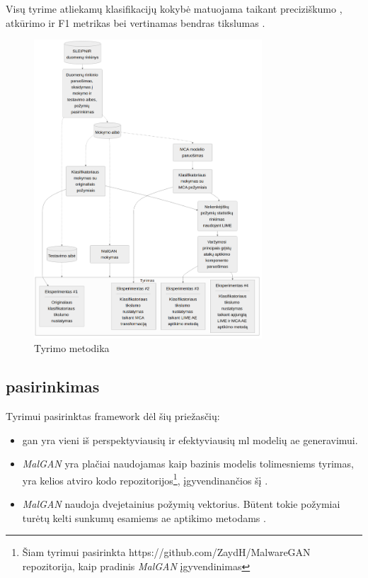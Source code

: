 Visų tyrime atliekamų klasifikacijų kokybė matuojama taikant preciziškumo , atkūrimo  ir F1 metrikas bei vertinamas bendras tikslumas . 

\begin{figure}[h]
    \centering
    \includegraphics[width=0.76\textwidth]{images/methodology.png}
    \caption{Tyrimo metodika}
    \label{fig:methodology}
\end{figure}

\subsection{  pasirinkimas}\label{sec:method:malgan}

Tyrimui pasirinktas  \gls{framework} dėl šių priežasčių:
\begin{itemize}
    \item \gls{gan} yra vieni iš perspektyviausių ir efektyviausių \gls{ml} modelių \gls{ae} generavimui.
    \item \textit{MalGAN} yra plačiai naudojamas kaip bazinis modelis tolimesniems tyrimas, yra kelios atviro kodo repozitorijos\footnote{Šiam tyrimui pasirinkta https://github.com/ZaydH/MalwareGAN repozitorija, kaip pradinis \textit{MalGAN} įgyvendinimas}, įgyvendinančios šį .
    \item \textit{MalGAN} naudoja dvejetainius požymių vektorius. Būtent tokie požymiai turėtų kelti sunkumų esamiems \gls{ae} aptikimo metodams .
\end{itemize}

